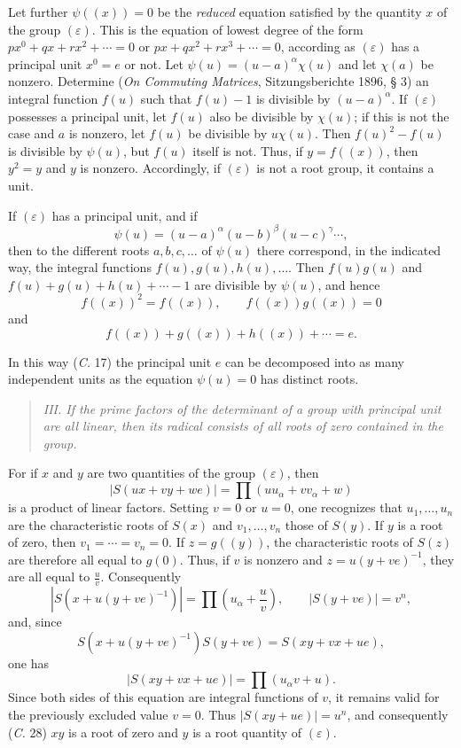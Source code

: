 \documentclass[11pt]{article}
\newcommand{\eps}{\varepsilon}
\begin{document}
Let further $\psi((x))=0$ be the \emph{reduced} equation satisfied by the quantity $x$ of the group $(\eps)$. This is the equation of lowest degree of the form $px^0+qx+rx^2+\cdots=0$ or $px+qx^2+rx^3+\cdots=0$, according as $(\eps)$ has a principal unit $x^0=e$ or not. Let $\psi(u)=(u-a)^\alpha\chi(u)$ and let $\chi(a)$ be nonzero. Determine (\emph{On Commuting Matrices}, Sitzungsberichte 1896, § 3) an integral function $f(u)$ such that $f(u)-1$ is divisible by $(u-a)^\alpha$. If $(\eps)$ possesses a principal unit, let $f(u)$ also be divisible by $\chi(u)$; if this is not the case and $a$ is nonzero, let $f(u)$ be divisible by $u\chi(u)$. Then $f(u)^2-f(u)$ is divisible by $\psi(u)$, but $f(u)$ itself is not. Thus, if $y=f((x))$, then $y^2=y$ and $y$ is nonzero. Accordingly, if $(\eps)$ is not a root group, it contains a unit.

If $(\eps)$ has a principal unit, and if
\[
 \psi(u)=(u-a)^\alpha(u-b)^\beta(u-c)^\gamma\cdots,
\]
then to the different roots $a,b,c,\ldots$ of $\psi(u)$ there correspond, in the indicated way, the integral functions $f(u),g(u),h(u),\ldots$. Then $f(u)g(u)$ and $f(u)+g(u)+h(u)+\cdots-1$ are divisible by $\psi(u)$, and hence
\begin{equation}\tag{3.}
 f((x))^2=f((x)),\qquad f((x))g((x))=0
\end{equation}
and
\begin{equation}\tag{4.}
 f((x))+g((x))+h((x))+\cdots=e.
\end{equation}

In this way (\emph{C.} 17) the principal unit $e$ can be decomposed into as many independent units as the equation $\psi(u)=0$ has distinct roots.

\begin{quote}\itshape
III. If the prime factors of the determinant of a group with principal unit are all linear, then its radical consists of all roots of zero contained in the group.
\end{quote}

For if $x$ and $y$ are two quantities of the group $(\eps)$, then
\[
 |S(ux+vy+we)|=\prod (uu_\alpha+vv_\alpha+w)
\]
is a product of linear factors. Setting $v=0$ or $u=0$, one recognizes that $u_1,\ldots,u_n$ are the characteristic roots of $S(x)$ and $v_1,\ldots,v_n$ those of $S(y)$. If $y$ is a root of zero, then $v_1=\cdots=v_n=0$. If $z=g((y))$, the characteristic roots of $S(z)$ are therefore all equal to $g(0)$. Thus, if $v$ is nonzero and $z=u(y+ve)^{-1}$, they are all equal to $\frac{u}{v}$. Consequently
\[
 |S(x+u(y+ve)^{-1})|=\prod\left(u_\alpha+\frac{u}{v}\right),\qquad |S(y+ve)|=v^n,
\]
and, since
\[
 S(x+u(y+ve)^{-1})S(y+ve)=S(xy+vx+ue),
\]
one has
\[
 |S(xy+vx+ue)|=\prod(u_\alpha v+u).
\]
Since both sides of this equation are integral functions of $v$, it remains valid for the previously excluded value $v=0$. Thus $|S(xy+ue)|=u^n$, and consequently (\emph{C.} 28) $xy$ is a root of zero and $y$ is a root quantity of $(\eps)$.
\end{document}
